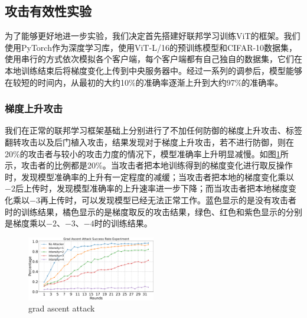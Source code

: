 \documentclass[conference]{IEEEtran}
\def\figGradAscentAttack{0.5\textwidth}
\begin{document}
\subsection{攻击有效性实验}
\label{exp:attack}

为了能够更好地进一步实验，我们决定首先搭建好联邦学习训练ViT的框架。我们使用PyTorch作为深度学习库，使用ViT-L/16的预训练模型和CIFAR-10数据集，使用串行的方式依次模拟各个客户端，每个客户端都有自己独自的数据集，它们在本地训练结束后将梯度变化上传到中央服务器中。经过一系列的调参后，模型能够在较短的时间内，从最初的大约10\%的准确率逐渐上升到大约97\%的准确率。

\subsubsection{\textbf{梯度上升攻击}}
\label{exp:attack:grad}

我们在正常的联邦学习框架基础上分别进行了不加任何防御的梯度上升攻击、标签翻转攻击以及后门植入攻击，结果发现对于梯度上升攻击，若不进行防御，则在20\%的攻击者与较小的攻击力度的情况下，模型准确率上升明显减慢。如图\hyperref[fig:gradAscent]{\ref{fig:gradAscent}}所示，攻击者的比例都是20\%。当攻击者把本地训练得到的梯度变化进行取反操作时，发现模型准确率的上升有一定程度的减缓；当攻击者把本地的梯度变化乘以$-2$后上传时，发现模型准确率的上升速率进一步下降；而当攻击者把本地梯度变化乘以$-3$再上传时，可以发现模型已经无法正常工作。蓝色显示的是没有攻击者时的训练结果，橘色显示的是梯度取反的攻击结果，绿色、红色和紫色显示的分别是梯度乘以$-2$、$-3$、$-4$时的训练结果。

\begin{figure}[htbp]
    \centerline{\includegraphics[width=\figGradAscentAttack]{pics/001-gradAttack-attackRate.pdf}}
    \caption{grad ascent attack}
    \label{fig:gradAscent}
\end{figure}
\end{document}
